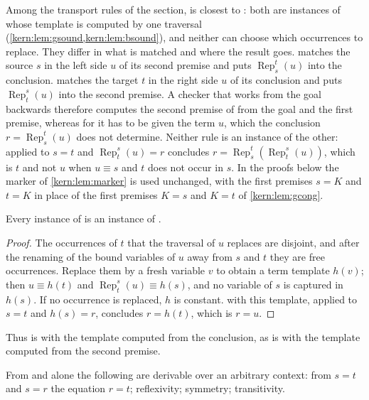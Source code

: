 Among the transport rules of the section,  is closest to
: both are instances of  whose template is
computed by one traversal (\cref{kern:lem:gsound,kern:lem:bsound}), and
neither can choose which occurrences to replace.  They differ in what is
matched and where the result goes.   matches the source $s$ in
the left side $u$ of its second premise and puts
$\operatorname{Rep}_{s}^{t}(u)$ into the conclusion.   matches
the target $t$ in the right side $u$ of its conclusion and puts
$\operatorname{Rep}_{t}^{s}(u)$ into the second premise.  A checker that works
from the goal backwards therefore computes the second premise of
 from the goal and the first premise, whereas for
 it has to be given the term $u$, which the conclusion
$r=\operatorname{Rep}_{s}^{t}(u)$ does not determine.  Neither rule is an
instance of the other:  applied to $s=t$ and
$\operatorname{Rep}_{t}^{s}(u)=r$ concludes
$r=\operatorname{Rep}_{s}^{t}(\operatorname{Rep}_{t}^{s}(u))$, which is $t$
and not $u$ when $u\equiv s$ and $t$ does not occur in $s$.  In the proofs
below the marker of \cref{kern:lem:marker} is used unchanged, with the first
premises $s=K$ and $t=K$ in place of the first premises $K=s$ and $K=t$ of
\cref{kern:lem:gcong}.

\begin{lemma}
\label{kern:lem:bsound}
Every instance of  is an instance of .
\end{lemma}

\begin{proof}
The occurrences of $t$ that the traversal of $u$ replaces are disjoint, and
after the renaming of the bound variables of $u$ away from $s$ and $t$ they
are free occurrences.  Replace them by a fresh variable $v$ to obtain a term
template $h(v)$; then $u\equiv h(t)$ and
$\operatorname{Rep}_{t}^{s}(u)\equiv h(s)$, and no variable of $s$ is
captured in $h(s)$.  If no occurrence is replaced, $h$ is constant.
 with this template, applied to $s=t$ and $h(s)=r$, concludes
$r=h(t)$, which is $r=u$.
\end{proof}

Thus  is  with the template computed from the
conclusion, as  is  with the template computed from
the second premise.

\begin{lemma}
\label{kern:lem:beq}
From  and  alone the following are derivable over
an arbitrary context: from $s=t$ and $s=r$ the equation $r=t$; reflexivity;
symmetry; transitivity.
\end{lemma}


